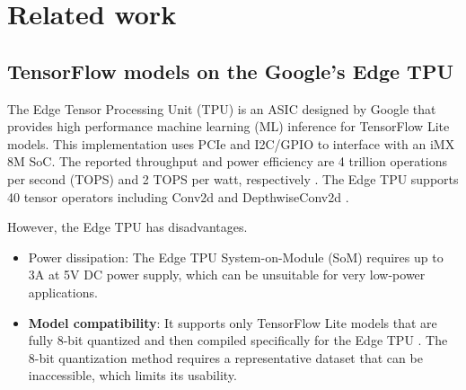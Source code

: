 \section{Related work}
\label{sec:related_work}
\subsection{TensorFlow models on the Google's Edge TPU}

The Edge Tensor Processing Unit (TPU) is an ASIC designed by Google that provides high performance machine learning (ML) inference for TensorFlow Lite models\cite{yazdanbakhsh2021evaluation}. This implementation uses PCIe and I2C/GPIO to interface with an iMX 8M SoC. The reported throughput and power efficiency are 4 trillion operations per second (TOPS) and 2 TOPS per watt, respectively \cite{coral2021Datasheet}. The Edge TPU supports 40 tensor operators including Conv2d and DepthwiseConv2d \cite{coral2021Compatibility}.

However, the Edge TPU has disadvantages.
\begin{itemize}
	\item Power dissipation: The Edge TPU System-on-Module (SoM) requires up to 3A at 5V DC power supply\cite{coral2021Datasheet}, which can be unsuitable for very low-power applications.
	\item \textbf{Model compatibility}: It supports only TensorFlow Lite models that are fully 8-bit quantized and then compiled specifically for the Edge TPU \cite{cass2019taking}. The 8-bit quantization method requires a representative dataset that can be inaccessible, which limits its usability.
\end{itemize}